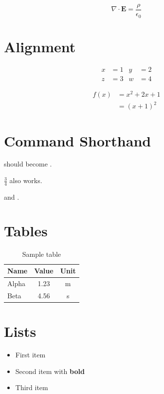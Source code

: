 \documentclass{article}
\begin{document}
\begin{equation*}
\nabla \cdot \mathbf{E} = \frac{\rho}{\epsilon_0}
\end{equation*}

\section{Alignment}

\begin{align}
x & = 1 & y & = 2 \\
z & = 3 & w & = 4
\end{align}

\begin{align*}
f(x) & = x^2 + 2x + 1 \\
     & = (x+1)^2
\end{align*}

\section{Command Shorthand}

 should become .

 $\frac34$ also works.

 and .

\section{Tables}

\begin{table}[h]
\centering
\begin{tabular}{lcc}
\toprule
Name & Value & Unit \\
\midrule
Alpha & 1.23 & m \\
Beta & 4.56 & s \\
\bottomrule
\end{tabular}
\caption{Sample table}
\label{tab:sample}
\end{table}

\section{Lists}

\begin{itemize}
\item First item
\item Second item with \textbf{bold}
\item Third item
\end{itemize}
\end{document}
